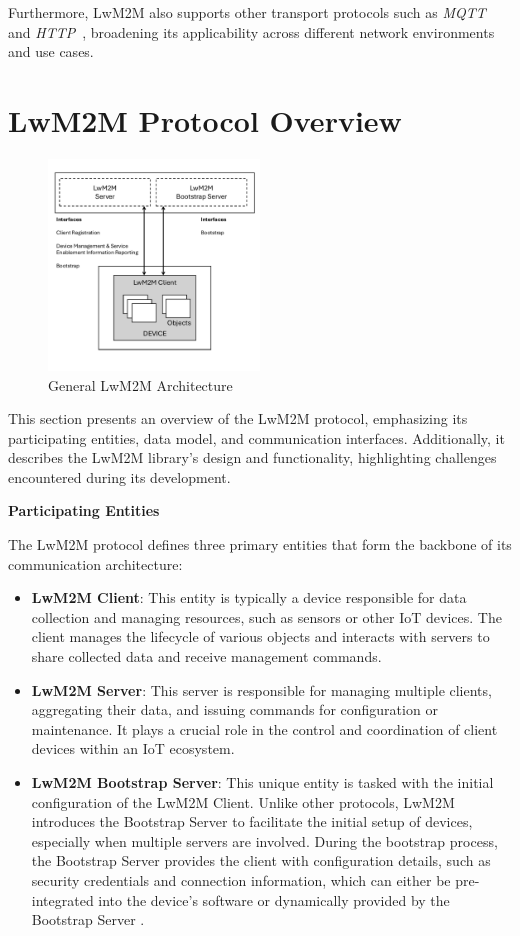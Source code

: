 \documentclass[11pt,sigconf]{iabart}
\begin{document}
Furthermore, LwM2M also supports other transport protocols such as \textit{MQTT}~\cite{mqtt-spec} and \textit{HTTP}~\cite{http-spec}, broadening its applicability across different network environments and use cases.

\section{LwM2M Protocol Overview} \label{overview}

\begin{figure}[h]
  \centering
  \includegraphics[width=0.5\textwidth]{figs/arch.pdf}
  \caption{General LwM2M Architecture}
  \label{fig:overall_architecture}
\end{figure}

This section presents an overview of the LwM2M protocol, emphasizing its participating entities, data model, and communication interfaces. Additionally, it describes the LwM2M library's design and functionality, highlighting challenges encountered during its development.

\textbf{Participating Entities}

The LwM2M protocol defines three primary entities that form the backbone of its communication architecture:
\begin{itemize}
    \item \textbf{LwM2M Client}: This entity is typically a device responsible for data collection and managing resources, such as sensors or other IoT devices. The client manages the lifecycle of various objects and interacts with servers to share collected data and receive management commands.
    \item \textbf{LwM2M Server}: This server is responsible for managing multiple clients, aggregating their data, and issuing commands for configuration or maintenance. It plays a crucial role in the control and coordination of client devices within an IoT ecosystem.
    \item \textbf{LwM2M Bootstrap Server}: This unique entity is tasked with the initial configuration of the LwM2M Client. Unlike other protocols, LwM2M introduces the Bootstrap Server to facilitate the initial setup of devices, especially when multiple servers are involved. During the bootstrap process, the Bootstrap Server provides the client with configuration details, such as security credentials and connection information, which can either be pre-integrated into the device's software or dynamically provided by the Bootstrap Server \cite{pop00006}.
\end{itemize}
\end{document}
